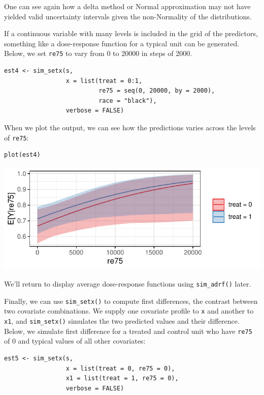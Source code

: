 One can see again how a delta method or Normal approximation may not have yielded valid uncertainty intervals given the non-Normality of the distributions.

If a continuous variable with many levels is included in the grid of the predictors, something like a dose-response function for a typical unit can be generated. Below, we set \texttt{re75} to vary from 0 to 20000 in steps of 2000.

\begin{verbatim}
est4 <- sim_setx(s,
                 x = list(treat = 0:1,
                          re75 = seq(0, 20000, by = 2000),
                          race = "black"),
                 verbose = FALSE)
\end{verbatim}

When we plot the output, we can see how the predictions varies across the levels of \texttt{re75}:

\begin{verbatim}
plot(est4)
\end{verbatim}

\begin{center}\includegraphics{figures/unnamed-chunk-16-1} \end{center}

We'll return to display average dose-response functions using \texttt{sim\_adrf()} later.

Finally, we can use \texttt{sim\_setx()} to compute first differences, the contrast between two covariate combinations. We supply one covariate profile to \texttt{x} and another to \texttt{x1}, and \texttt{sim\_setx()} simulates the two predicted values and their difference. Below, we simulate first difference for a treated and control unit who have \texttt{re75} of 0 and typical values of all other covariates:

\begin{verbatim}
est5 <- sim_setx(s,
                 x = list(treat = 0, re75 = 0),
                 x1 = list(treat = 1, re75 = 0),
                 verbose = FALSE)
\end{verbatim}


